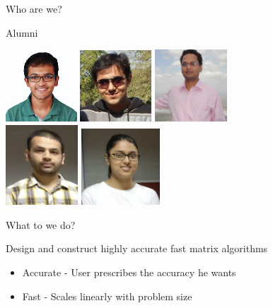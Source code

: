 \documentclass{beamer}
\begin{document}
\begin{frame}{Who are we?}
	\begin{center}
	\huge{Alumni}
	\end{center}
	\begin{center}
	\includegraphics[width=0.2\textwidth]{./images/Shyam.jpeg} \hspace{1em}
	\includegraphics[width=0.2\textwidth]{./images/Karan.jpeg} \hspace{1em}
	\includegraphics[width=0.2025\textwidth]{./images/Nachiketa.jpg} \hspace{1em}\\
	\vspace{1em}
	\includegraphics[width=0.2025\textwidth]{./images/Abhay.png} \hspace{1em}
	\includegraphics[width=0.22\textwidth]{./images/Richa.png}
	\end{center}
\end{frame}

\begin{frame}{What to we do?}
	\Large
	\begin{center}
	Design and construct highly accurate fast matrix algorithms
	\begin{itemize}
		\item
		Accurate - User prescribes the accuracy he wants
		\item
		Fast - Scales linearly with problem size
	\end{itemize}
	\end{center}
\end{frame}
\end{document}
